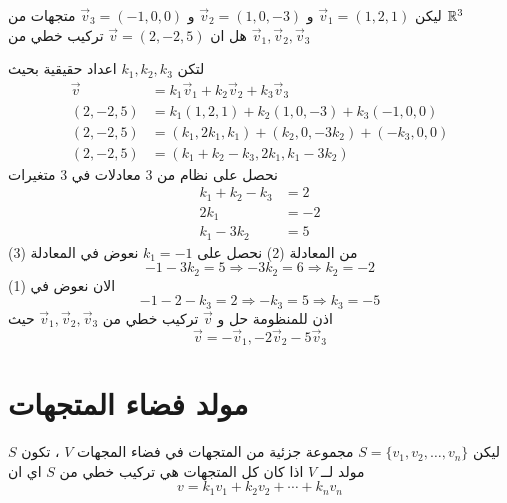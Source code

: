 \begin{example}
	ليكن $\vec{v}_1=(1,2,1)$ و $\vec{v}_2=(1,0,-3)$ و $\vec{v}_3=(-1,0,0)$ متجهات من $\mathbb{R}^3$ \\ هل  ان $\vec{v} = (2,-2,5)$ تركيب خطي من 
	$\vec{v}_1, \vec{v}_2, \vec{v}_3$
\end{example}
\begin{solution}
	لتكن $k_1, k_2, k_3$ اعداد حقيقية بحيث
	\begin{align*}
		\vec{v} &= k_1\vec{v}_1 + k_2\vec{v}_2 + k_3\vec{v}_3\\
		(2, -2, 5) &= k_1(1,2,1) + k_2(1,0,-3) + k_3 (-1, 0,0)\\
		(2, -2, 5) &= (k_1, 2k_1 , k_1) + (k_2, 0, -3k_2) + (-k_3, 0,0 )\\
		(2, -2, 5) &= (k_1+k_2-k_3, 2k_1 , k_1-3k_2)
	\end{align*}
	نحصل على نظام من 3 معادلات في 3 متغيرات
\begin{align}
	k_1 + k_2 - k_3 &= 2\\
	2k_1 & = -2\\
	k_1 -3k_2 &= 5
\end{align}
من المعادلة (2) نحصل على $k_1 = -1 $ نعوض في المعادلة (3) 
\[
-1 - 3k_2 = 5\Rightarrow -3k_2 = 6 \Rightarrow k_2 = -2
\]
الان نعوض في (1)
\[
-1 - 2 - k_3 = 2 \Rightarrow -k_3 = 5 \Rightarrow k_3 =-5
\]
اذن للمنظومة حل و $\vec{v}$ تركيب خطي من 	$\vec{v}_1, \vec{v}_2, \vec{v}_3$ حيث
\[
\vec{v} = 	-\vec{v}_1, -2\vec{v}_2 -5 \vec{v}_3
\]
\end{solution}

\section{مولد فضاء المتجهات}
ليكن $S = \{v_1, v_2, \dots, v_n\}$ مجموعة جزئية من المتجهات في فضاء المجهات $V$ ، تكون $S$ مولد لــ $V$ اذا كان كل المتجهات هي تركيب خطي من $S$ اي ان
\[
v = k_1v_1 + k_2v_2 + \cdots + k_nv_n
\]

